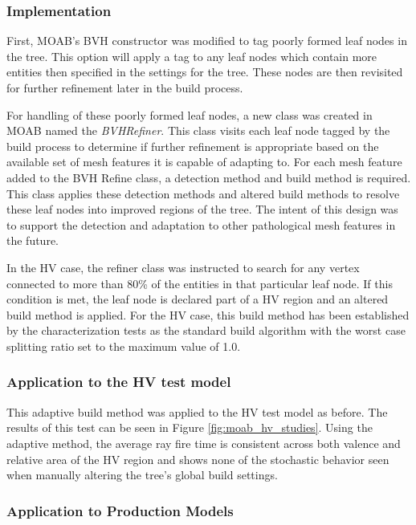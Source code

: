 \subsubsection{Implementation}\label{subsec:adaptive_construction_implementation}

First, MOAB's BVH constructor was modified to tag poorly
formed leaf nodes in the tree. This option will apply a tag to any leaf nodes
which contain more entities then specified in the settings for the tree. These
nodes are then revisited for further refinement later in the build process.

For handling of these poorly formed leaf nodes, a new class was created in MOAB
named the \textit{BVHRefiner}. This class visits each leaf node tagged by the
build process to determine if further refinement is appropriate based on the
available set of mesh features it is capable of adapting to. For each mesh feature
added to the BVH Refine class, a detection method and build method is
required. This class applies these detection methods and altered build methods
to resolve these leaf nodes into improved regions of the tree. The intent of
this design was to support the detection and adaptation to other pathological mesh
features in the future.

In the HV case, the refiner class was instructed to search for any vertex
connected to more than 80\% of the entities in that particular leaf node. If
this condition is met, the leaf node is declared part of a HV region and an
altered build method is applied. For the HV case, this build method has been
established by the characterization tests as the standard build algorithm with
the worst case splitting ratio set to the maximum value of 1.0.

\subsubsection{Application to the HV test model}

This adaptive build method was applied to the HV test model as before. The
results of this test can be seen in Figure \ref{fig:moab_hv_studies}. Using the
adaptive method, the average ray fire time is consistent across both valence and
relative area of the HV region and shows none of the stochastic behavior seen
when manually altering the tree's global build settings.

\subsubsection{Application to Production Models}

